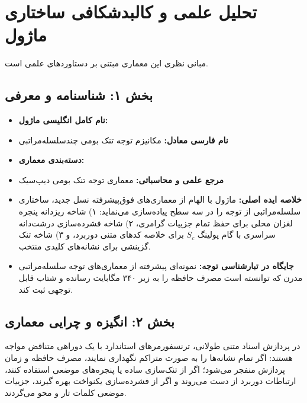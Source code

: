 \section{تحلیل علمی و کالبدشکافی ساختاری ماژول }

مبانی نظری این معماری مبتنی بر دستاوردهای علمی \cite{vaswani2017attention} است.
\label{sec:nsa_attention}

\subsection*{بخش ۱: شناسنامه و معرفی }
\begin{itemize}
    \item \textbf{نام کامل انگلیسی ماژول:} 
    \item \textbf{نام فارسی معادل:} مکانیزم توجه تنک بومی چندسلسله‌مراتبی 
    \item \textbf{دسته‌بندی معماری:} 
    \item \textbf{مرجع علمی و محاسباتی:} معماری توجه تنک بومی دیپ‌سیک 
    \item \textbf{خلاصه ایده اصلی:} ماژول  با الهام از معماری‌های فوق‌پیشرفته نسل جدید، ساختاری سلسله‌مراتبی از توجه را در سه سطح پیاده‌سازی می‌نماید: ۱) شاخه ریزدانه پنجره لغزان محلی  برای حفظ تمام جزییات گرامری، ۲) شاخه فشرده‌سازی درشت‌دانه سراسری  با گام پولینگ $S_c$ برای خلاصه کدهای متنی دوربرد، و ۳) شاخه تنک گزینشی  برای نشانه‌های کلیدی منتخب.
    \item \textbf{جایگاه در تبارشناسی توجه:} نمونه‌ای پیشرفته از معماری‌های توجه سلسله‌مراتبی مدرن که توانسته است مصرف حافظه را به زیر ۳۴۰ مگابایت رسانده و شتاب قابل توجهی ثبت کند.
\end{itemize}

\subsection*{بخش ۲: انگیزه و چرایی معماری }
در پردازش اسناد متنی طولانی، ترنسفورمرهای استاندارد با یک دوراهی متناقض مواجه هستند: اگر تمام نشانه‌ها را به صورت متراکم نگهداری نمایند، مصرف حافظه و زمان پردازش منفجر می‌شود؛ اگر از تنک‌سازی ساده یا پنجره‌های موضعی استفاده کنند، ارتباطات دوربرد از دست می‌روند و اگر از فشرده‌سازی یکنواخت بهره گیرند، جزییات موضعی کلمات تار و محو می‌گردند.

